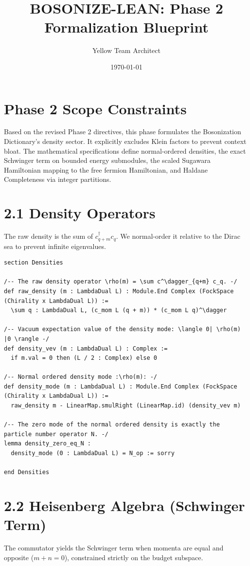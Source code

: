 \documentclass[12pt]{article}
\title{BOSONIZE-LEAN: Phase 2 Formalization Blueprint}
\author{Yellow Team Architect}
\date{\today}
\begin{document}
\maketitle

\section{Phase 2 Scope Constraints}
Based on the revised Phase 2 directives, this phase formulates the Bosonization Dictionary's density sector. It explicitly excludes Klein factors to prevent context bloat. The mathematical specifications define normal-ordered densities, the exact Schwinger term on bounded energy submodules, the scaled Sugawara Hamiltonian mapping to the free fermion Hamiltonian, and Haldane Completeness via integer partitions.

\section{2.1 Density Operators}
The raw density is the sum of $c^\dagger_{q+m} c_q$. We normal-order it relative to the Dirac sea to prevent infinite eigenvalues.

\begin{lstlisting}[language=lean]
section Densities

/-- The raw density operator \rho(m) = \sum c^\dagger_{q+m} c_q. -/
def raw_density (m : LambdaDual L) : Module.End Complex (FockSpace (Chirality x LambdaDual L)) :=
  \sum q : LambdaDual L, (c_mom L (q + m)) * (c_mom L q)^\dagger 

/-- Vacuum expectation value of the density mode: \langle 0| \rho(m) |0 \rangle -/
def density_vev (m : LambdaDual L) : Complex :=
  if m.val = 0 then (L / 2 : Complex) else 0

/-- Normal ordered density mode :\rho(m): -/
def density_mode (m : LambdaDual L) : Module.End Complex (FockSpace (Chirality x LambdaDual L)) :=
  raw_density m - LinearMap.smulRight (LinearMap.id) (density_vev m)

/-- The zero mode of the normal ordered density is exactly the particle number operator N. -/
lemma density_zero_eq_N : 
  density_mode (0 : LambdaDual L) = N_op := sorry

end Densities
\end{lstlisting}

\section{2.2 Heisenberg Algebra (Schwinger Term)}
The commutator yields the Schwinger term when momenta are equal and opposite ($m+n=0$), constrained strictly on the budget subspace.
\end{document}
